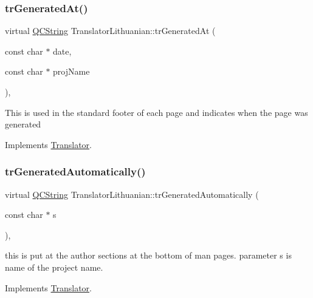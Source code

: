 \mbox{\label{class_translator_lithuanian_a8e2dcbf0a67e081499a380d5e8158380}} 
\subsubsection{\texorpdfstring{trGeneratedAt()}{trGeneratedAt()}}
{\footnotesize\ttfamily virtual \mbox{\hyperlink{class_q_c_string}{Q\+C\+String}} Translator\+Lithuanian\+::tr\+Generated\+At (\begin{DoxyParamCaption}\item[{const char $\ast$}]{date,  }\item[{const char $\ast$}]{proj\+Name }\end{DoxyParamCaption})\hspace{0.3cm}{\ttfamily [inline]}, {\ttfamily [virtual]}}

This is used in the standard footer of each page and indicates when the page was generated 

Implements \mbox{\hyperlink{class_translator}{Translator}}.

\mbox{\label{class_translator_lithuanian_a4e12e27c6555c1a5a100c8ac86135b0d}} 
\subsubsection{\texorpdfstring{trGeneratedAutomatically()}{trGeneratedAutomatically()}}
{\footnotesize\ttfamily virtual \mbox{\hyperlink{class_q_c_string}{Q\+C\+String}} Translator\+Lithuanian\+::tr\+Generated\+Automatically (\begin{DoxyParamCaption}\item[{const char $\ast$}]{s }\end{DoxyParamCaption})\hspace{0.3cm}{\ttfamily [inline]}, {\ttfamily [virtual]}}

this is put at the author sections at the bottom of man pages. parameter s is name of the project name. 

Implements \mbox{\hyperlink{class_translator}{Translator}}.

